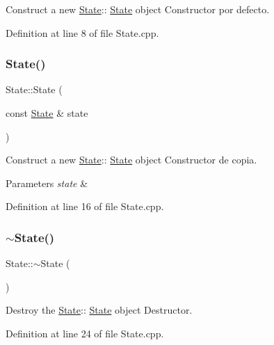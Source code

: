 Construct a new \hyperlink{class_state}{State}\+:\+: \hyperlink{class_state}{State} object Constructor por defecto. 



Definition at line 8 of file State.\+cpp.

\mbox{\label{class_state_a5ca97340266d486dfa42225f19c40de3}} 
\subsubsection{\texorpdfstring{State()}{State()}\hspace{0.1cm}{\footnotesize\ttfamily [2/2]}}
{\footnotesize\ttfamily State\+::\+State (\begin{DoxyParamCaption}\item[{const \hyperlink{class_state}{State} \&}]{state }\end{DoxyParamCaption})}



Construct a new \hyperlink{class_state}{State}\+:\+: \hyperlink{class_state}{State} object Constructor de copia. 


\begin{DoxyParams}{Parameters}
{\em state} & \\
\hline
\end{DoxyParams}


Definition at line 16 of file State.\+cpp.

\mbox{\label{class_state_afab438d92b90dc18d194dbd9c9c8bab3}} 
\subsubsection{\texorpdfstring{$\sim$\+State()}{~State()}}
{\footnotesize\ttfamily State\+::$\sim$\+State (\begin{DoxyParamCaption}{ }\end{DoxyParamCaption})}



Destroy the \hyperlink{class_state}{State}\+:\+: \hyperlink{class_state}{State} object Destructor. 



Definition at line 24 of file State.\+cpp.




